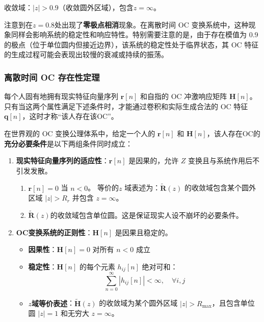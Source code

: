 收敛域：$|z| > 0.9$（收敛圆外区域），包含\(z = \infty\)。

注意到在\(z = 0.8\)处出现了\textbf{零极点相消}现象。在离散时间 OC 变换系统中，这种现象同样会影响系统的稳定性和响应特性。特别需要注意的是，由于存在模值为 $0.9$ 的极点（位于单位圆内但接近边界），该系统的稳定性处于临界状态，其 OC 特征的生成过程可能会表现出较慢的衰减或持续的振荡。

\subsubsection{离散时间 OC 存在性定理}

每个人固有地拥有现实特征向量序列 $\mathbf{r}[n]$ 和自指的 OC 冲激响应矩阵 $\mathbf{H}[n]$。只有当这两个属性满足下述条件时，才能通过卷积和实际生成合法的 OC 特征 $\mathbf{q}[n]$，这时才称“该人存在该OC”。

\begin{theorem}
    在\wkn{}世界观的 OC 变换公理体系中，给定一个人的 $\mathbf{r}[n]$ 和 $\mathbf{H}[n]$，该人存在OC的\textbf{充分必要条件}是以下两组条件同时成立：
    \begin{enumerate}
        \item \textbf{现实特征向量序列的适应性}：$\mathbf{r}[n]$ 是因果的，允许 $Z$ 变换且与系统作用后不引发发散。
              \begin{enumerate}
                  \item $\mathbf{r}[n]=0$ 当 $n<0$。
                        等价的$z$ 域表述为：$\tilde{\mathbf{R}}(z)$ 的收敛域包含某个圆外区域 $|z|>R_r$ 并包含 \(z=\infty\)。
                  \item \(\tilde{\mathbf{R}}(z)\)的收敛域包含单位圆。这是保证现实人设不崩坏的必要条件。
              \end{enumerate}
        \item \textbf{OC变换系统的正则性}：$\mathbf{H}[n]$ 是因果且稳定的。
              \begin{itemize}
                  \item \textbf{因果性}：$\mathbf{H}[n] = 0$ 对所有 $n < 0$ 成立
                  \item \textbf{稳定性}：$\mathbf{H}[n]$ 的每个元素 $h_{ij}[n]$ 绝对可和：
                        \begin{equation}
                            \sum_{n=0}^\infty |h_{ij}[n]| < \infty, \quad \forall i,j
                        \end{equation}
                  \item \textbf{$z$域等价表述}：$\tilde{\mathbf{H}}(z)$ 的收敛域为某个圆外区域 $|z| > R_{\text{max}}$，且包含单位圆 $|z| = 1$ 和无穷大 \(z=\infty\)。
              \end{itemize}
    \end{enumerate}
\end{theorem}

